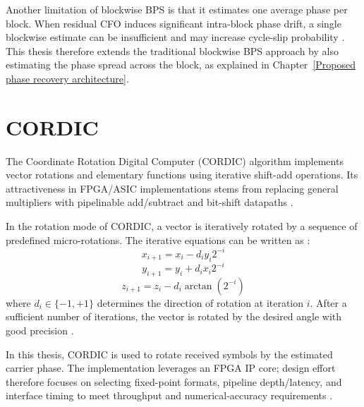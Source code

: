 Another limitation of blockwise BPS is that it estimates one average phase per block. When
residual CFO induces significant intra-block phase drift, a single blockwise estimate can be
insufficient and may increase cycle-slip probability \cite{Pfau2009JLT}. This thesis therefore
extends the traditional blockwise BPS approach by also estimating the phase spread across the
block, as explained in Chapter~\ref{Proposed phase recovery architecture}.

\section{CORDIC}
The Coordinate Rotation Digital Computer (CORDIC) algorithm implements vector rotations and
elementary functions using iterative shift-add operations. Its attractiveness in FPGA/ASIC
implementations stems from replacing general multipliers with pipelinable add/subtract and
bit-shift datapaths \cite{Volder1959TEC,Meher2009TCASI}.

In the rotation mode of CORDIC, a vector is iteratively rotated by a sequence of predefined
micro-rotations. The iterative equations can be written as \cite{Volder1959TEC,Meher2009TCASI}:
\begin{equation}
x_{i+1} = x_i - d_i y_i 2^{-i}
\end{equation}
\begin{equation}
y_{i+1} = y_i + d_i x_i 2^{-i}
\end{equation}
\begin{equation}
z_{i+1} = z_i - d_i \arctan(2^{-i})
\end{equation}
where $d_i \in \{-1, +1\}$ determines the direction of rotation at iteration $i$.
After a sufficient number of iterations, the vector is rotated by the desired angle with
good precision \cite{Meher2009TCASI}.

In this thesis, CORDIC is used to rotate received symbols by the estimated carrier phase.
The implementation leverages an FPGA IP core; design effort therefore focuses on selecting
fixed-point formats, pipeline depth/latency, and interface timing to meet throughput and
numerical-accuracy requirements \cite{AMD2021PG105}.
  